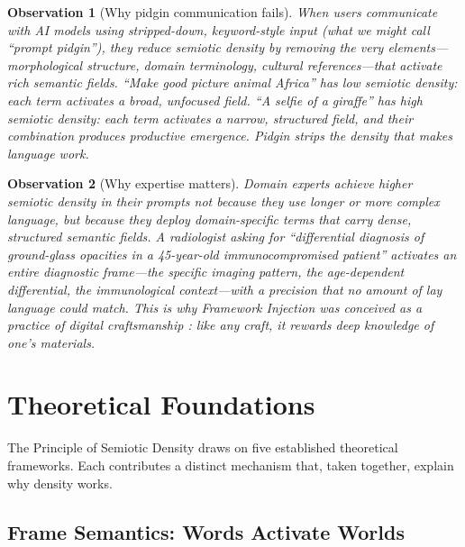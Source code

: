 \documentclass[12pt,a4paper]{article}
\newtheorem{observation}{Observation}[section]
\begin{document}
\begin{observation}[Why pidgin communication fails]
\label{obs:pidgin}
When users communicate with AI models using stripped-down, keyword-style input (what we might call ``prompt pidgin''), they reduce semiotic density by removing the very elements---morphological structure, domain terminology, cultural references---that activate rich semantic fields.
``Make good picture animal Africa'' has low semiotic density: each term activates a broad, unfocused field.
``A selfie of a giraffe'' has high semiotic density: each term activates a narrow, structured field, and their combination produces productive emergence.
Pidgin strips the density that makes language work.
\end{observation}

\begin{observation}[Why expertise matters]
\label{obs:expertise}
Domain experts achieve higher semiotic density in their prompts not because they use longer or more complex language, but because they deploy domain-specific terms that carry dense, structured semantic fields.
A radiologist asking for ``differential diagnosis of ground-glass opacities in a 45-year-old immunocompromised patient'' activates an entire diagnostic frame---the specific imaging pattern, the age-dependent differential, the immunological context---with a precision that no amount of lay language could match.
This is why Framework Injection was conceived as a practice of \textit{digital craftsmanship} \cite{gomes2026founding}: like any craft, it rewards deep knowledge of one's materials.
\end{observation}


\section{Theoretical Foundations}
\label{sec:theory}

The Principle of Semiotic Density draws on five established theoretical frameworks.
Each contributes a distinct mechanism that, taken together, explain why density works.

\subsection{Frame Semantics: Words Activate Worlds}
\label{subsec:frames}
\end{document}
